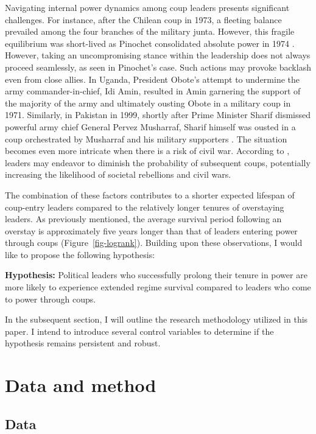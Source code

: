 \documentclass[
  12pt,
  a4paper,
  12pt]{article}
\begin{document}
Navigating internal power dynamics among coup leaders presents
significant challenges. For instance, after the Chilean coup in 1973, a
fleeting balance prevailed among the four branches of the military
junta. However, this fragile equilibrium was short-lived as Pinochet
consolidated absolute power in 1974 \citep{geddes2018}. However, taking
an uncompromising stance within the leadership does not always proceed
seamlessly, as seen in Pinochet's case. Such actions may provoke
backlash even from close allies. In Uganda, President Obote's attempt to
undermine the army commander-in-chief, Idi Amin, resulted in Amin
garnering the support of the majority of the army and ultimately ousting
Obote in a military coup in 1971. Similarly, in Pakistan in 1999,
shortly after Prime Minister Sharif dismissed powerful army chief
General Pervez Musharraf, Sharif himself was ousted in a coup
orchestrated by Musharraf and his military supporters
\citep{sudduth2017}. The situation becomes even more intricate when
there is a risk of civil war. According to \citet{roessler2011}, leaders
may endeavor to diminish the probability of subsequent coups,
potentially increasing the likelihood of societal rebellions and civil
wars.

The combination of these factors contributes to a shorter expected
lifespan of coup-entry leaders \citep{dahl2023} compared to the
relatively longer tenures of overstaying leaders. As previously
mentioned, the average survival period following an overstay is
approximately five years longer than that of leaders entering power
through coups (Figure~\ref{fig-logrank}). Building upon these
observations, I would like to propose the following hypothesis:

\textbf{Hypothesis:} Political leaders who successfully prolong their
tenure in power are more likely to experience extended regime survival
compared to leaders who come to power through coups.

In the subsequent section, I will outline the research methodology
utilized in this paper. I intend to introduce several control variables
to determine if the hypothesis remains persistent and robust.

\section{Data and method}\label{data-and-method}

\subsection{Data}\label{data}
\end{document}
